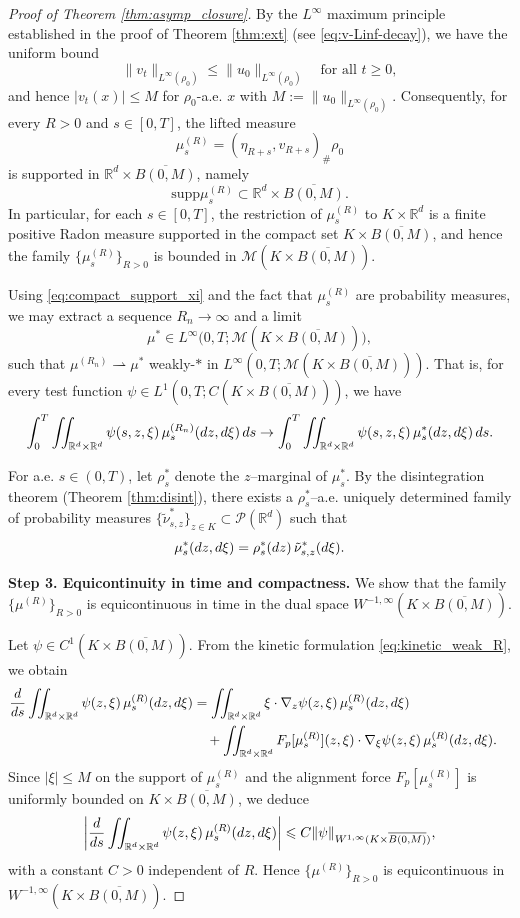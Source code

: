 \documentclass[10pt,a4paper]{amsart}
\newcommand{\R}{\mathbb R}
\newcommand{\bq}{\begin{equation}}
\newcommand{\calM}{\mathcal M}
\newcommand{\calP}{\mathcal P}
\newcommand{\ds}{\textnormal{d}s}
\newcommand{\dz}{\textnormal{d}z}
\newcommand{\eq}{\end{equation}}
\renewcommand{\ge}{\geqslant}
\newcommand{\intr}{\int_{\R^d}}
\newcommand{\intrr}{\iint_{\R^d \times \R^d}}
\renewcommand{\le}{\leqslant}
\newcommand{\lt}{\left}
\newcommand{\rd}{\textnormal{d}}
\newcommand{\rt}{\right}
\newcommand{\supp}{\text{supp}}
\begin{document}
\begin{proof}[Proof of Theorem \ref{thm:asymp_closure}]
By the $L^\infty$ maximum principle established in the proof of Theorem \ref{thm:ext} (see \eqref{eq:v-Linf-decay}), we have the uniform bound
\[%
\|v_t\|_{L^\infty(\rho_0)} \le \|u_0\|_{L^\infty(\rho_0)}
\quad\text{for all } t\ge0,
\]%
and hence $|v_t(x)|\le M$ for $\rho_0$-a.e.  $x$ with $M:=\|u_0\|_{L^\infty(\rho_0)}$. Consequently, for every $R>0$ and $s\in[0,T]$, the lifted measure
\[
\mu^{(R)}_s=(\eta_{R+s},v_{R+s})_\#\rho_0
\]
is supported in $\R^d\times\overline{B(0,M)}$, namely
\bq\label{eq:compact_support_xi}
\supp\mu^{(R)}_s \subset \R^d\times\overline{B(0,M)} .
\eq
In particular, for each $s\in[0,T]$, the restriction of $\mu^{(R)}_s$ to $K\times\R^d$ is a finite positive Radon measure supported in the compact set $K\times\overline{B(0,M)}$, and hence the family $\{\mu^{(R)}_s\}_{R>0}$ is bounded in $\calM(K\times\overline{B(0,M)})$.

Using \eqref{eq:compact_support_xi} and the fact that $\mu^{(R)}_s$ are probability measures, we may extract a sequence $R_n\to\infty$ and a limit
\[
\mu^\ast \in L^\infty\bigl(0,T;\calM(K\times\overline{B(0,M)})\bigr), 
\]
such that $\mu^{(R_n)}\rightharpoonup\mu^\ast$ weakly-$\ast$ in $L^\infty (0,T;\calM(K\times\overline{B(0,M)}) )$. That is, for every test function
$\psi\in L^1(0,T;C(K\times\overline{B(0,M)}))$, we have
\[%
\int_0^T \intrr \psi(s,z,\xi)\,\mu^{(R_n)}_s(\dz,\rd\xi)\,\ds \to \int_0^T \intrr \psi(s,z,\xi)\,\mu^\ast_s(\dz,\rd\xi)\,\ds.
\]%

For a.e.  $s\in(0,T)$, let $\rho^\ast_s$ denote the $z$--marginal of $\mu^\ast_s$. By the disintegration theorem (Theorem \ref{thm:disint}), there exists a $\rho^\ast_s$--a.e.  uniquely determined family of probability measures $\{\tilde\nu^\ast_{s,z}\}_{z\in K}\subset\calP(\R^d)$ such that
\[
\mu^\ast_s(\dz,\rd\xi)=\rho^\ast_s(\dz)\,\tilde\nu^\ast_{s,z}(\rd\xi).
\]

\medskip
\noindent\textbf{Step 3. Equicontinuity in time and compactness.} We show that the family $\{\mu^{(R)}\}_{R>0}$ is equicontinuous in time in the dual space $W^{-1,\infty}(K\times\overline{B(0,M)})$.

Let $\psi\in C^1(K\times\overline{B(0,M)})$. From the kinetic formulation \eqref{eq:kinetic_weak_R}, we obtain
\begin{align*}
\frac{\rd}{\rd s}\intrr\psi(z,\xi)\,\mu^{(R)}_s(\dz,\rd\xi) &= \intrr \xi\cdot\nabla_z\psi(z,\xi)\,\mu^{(R)}_s(\dz,\rd\xi)\cr
&\quad + \intrr F_p[\mu^{(R)}_s](z,\xi)\cdot\nabla_\xi\psi(z,\xi)\,\mu^{(R)}_s(\dz,\rd\xi).
\end{align*}
Since $|\xi|\le M$ on the support of $\mu^{(R)}_s$ and the alignment force 
$F_p[\mu^{(R)}_s]$ is uniformly bounded on $K\times\overline{B(0,M)}$, we deduce
\[
\lt|\frac{\rd}{\rd s}\intrr\psi(z,\xi)\,\mu^{(R)}_s(\dz,\rd\xi) \rt|
\le C\|\psi\|_{W^{1,\infty}(K\times\overline{B(0,M)})},
\]
with a constant $C >0$ independent of $R$.  Hence $\{\mu^{(R)}\}_{R>0}$ is equicontinuous in  $W^{-1,\infty}(K\times\overline{B(0,M)})$.


\end{proof}
\end{document}
